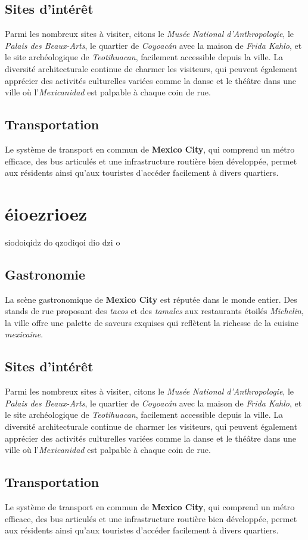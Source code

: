\documentclass[12pt, a4paper]{article}
\begin{document}
\subsection*{\textbf{Sites d'intérêt}}

Parmi les nombreux sites à visiter, citons le \textit{Musée National d'Anthropologie}, le \textit{Palais des Beaux-Arts}, le quartier de \textit{Coyoacán} avec la maison de \textit{Frida Kahlo}, et le site archéologique de \textit{Teotihuacan}, facilement accessible depuis la ville.
La diversité architecturale continue de charmer les visiteurs, qui peuvent également apprécier des activités culturelles variées comme la danse et le théâtre dans une ville où l'\textit{Mexicanidad} est palpable à chaque coin de rue. \subsection*{\textbf{Transportation}} Le système de transport en commun de \textbf{Mexico City}, qui comprend un métro efficace, des bus articulés et une infrastructure routière bien développée, permet aux résidents ainsi qu'aux touristes d'accéder facilement à divers quartiers.


\section{éioezrioez}
siodoiqidz
do
qzodiqoi
dio
dzi
o
\subsection*{\textbf{Gastronomie}}


La scène gastronomique de \textbf{Mexico City} est réputée dans le monde entier. Des stands de rue proposant des \textit{tacos} et des \textit{tamales} aux restaurants étoilés \textit{Michelin}, la ville offre une palette de saveurs exquises qui reflètent la richesse de la cuisine \textit{mexicaine}.

\subsection*{\textbf{Sites d'intérêt}}

Parmi les nombreux sites à visiter, citons le \textit{Musée National d'Anthropologie}, le \textit{Palais des Beaux-Arts}, le quartier de \textit{Coyoacán} avec la maison de \textit{Frida Kahlo}, et le site archéologique de \textit{Teotihuacan}, facilement accessible depuis la ville.
La diversité architecturale continue de charmer les visiteurs, qui peuvent également apprécier des activités culturelles variées comme la danse et le théâtre dans une ville où l'\textit{Mexicanidad} est palpable à chaque coin de rue. \subsection*{\textbf{Transportation}} Le système de transport en commun de \textbf{Mexico City}, qui comprend un métro efficace, des bus articulés et une infrastructure routière bien développée, permet aux résidents ainsi qu'aux touristes d'accéder facilement à divers quartiers.
\end{document}
